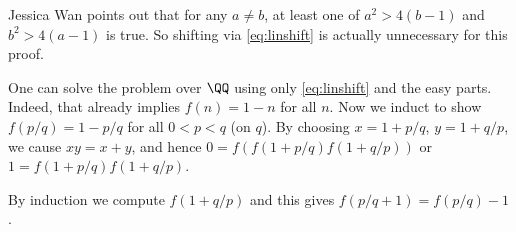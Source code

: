 \begin{remark*}
  Jessica Wan points out that
  for any $a \neq b$, at least one of $a^2 > 4(b-1)$
  and $b^2 > 4(a-1)$ is true.
  So shifting via \eqref{eq:linshift}
  is actually unnecessary for this proof.
\end{remark*}

\begin{remark*}
  One can solve the problem over $\QQ$
  using only \eqref{eq:linshift} and the easy parts.
  Indeed, that already implies $f(n) = 1-n$ for all $n$.
  Now we induct to show $f(p/q) = 1-p/q$ for all $0 < p < q$ (on $q$).
  By choosing $x = 1+p/q$, $y = 1+q/p$,
  we cause $xy = x+y$,
  and hence $0 = f\left( f(1+p/q)f(1+q/p) \right)$
  or $1 = f(1+p/q)f(1+q/p)$.

  By induction we compute $f(1+q/p)$
  and this gives $f(p/q+1) = f(p/q)-1$.
\end{remark*}
\pagebreak